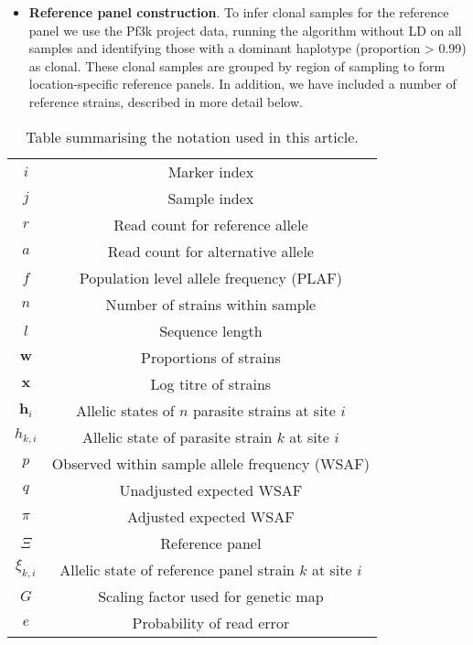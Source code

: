 \documentclass{nature}
\begin{document}
\begin{itemize}
\item {\bf Reference panel construction}. To infer clonal samples for the reference panel we use the Pf3k \cite{Pf3k2016} project data, running the algorithm without LD on all samples and identifying those with a dominant haplotype (proportion > 0.99) as clonal.  These clonal samples are grouped by region of sampling to form location-specific reference panels.  In addition, we have included a number of reference strains, described in more detail below.

\end{itemize}

\begin{table}\centering
{\renewcommand{\arraystretch}{0.6}
\begin{tabular}{c|c}\hline
$i$              & Marker index\\
$j$              & Sample index \\
$r$              & Read count for reference allele \\
$a$              & Read count for alternative allele \\
$f$              & Population level allele frequency (PLAF) \\
$n$              & Number of strains within sample \\
$l$              & Sequence length \\
$\mathbf{w}$      & Proportions of strains \\
$\mathbf{x}$	& Log titre of strains \\
$\mathbf{h}_{i}$ & Allelic states of $n$ parasite strains at site $i$ \\
$h_{k,i}$   & Allelic state of parasite strain $k$ at site $i$\\
$p$              & Observed within sample allele frequency (WSAF) \\
$q$              & Unadjusted expected WSAF  \\
$\pi$            & Adjusted expected WSAF \\
$\Xi$            & Reference panel\\
$\xi_{k,i}$     & Allelic state of reference panel strain $k$ at site $i$\\
$G$              & Scaling factor used for genetic map\\
$e$              & Probability of read error\\ \hline
\end{tabular}
}
\caption{Table summarising the notation used in this article.}\label{tab:notation}
\end{table}
\end{document}
